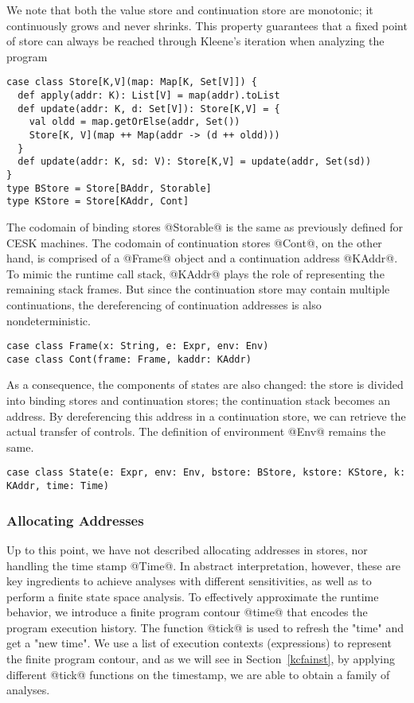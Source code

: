 \documentclass[acmsmall]{acmart}\settopmatter{}
\begin{document}
We note that both the value store and continuation store are monotonic;
it continuously grows and never shrinks. This property guarantees that
a fixed point of store can always be reached through Kleene's
iteration when analyzing the program

\begin{lstlisting}
case class Store[K,V](map: Map[K, Set[V]]) {
  def apply(addr: K): List[V] = map(addr).toList
  def update(addr: K, d: Set[V]): Store[K,V] = {
    val oldd = map.getOrElse(addr, Set())
    Store[K, V](map ++ Map(addr -> (d ++ oldd)))
  }
  def update(addr: K, sd: V): Store[K,V] = update(addr, Set(sd))
}
type BStore = Store[BAddr, Storable]
type KStore = Store[KAddr, Cont]
\end{lstlisting}

The codomain of binding stores @Storable@ is the same as previously defined for CESK 
machines. The codomain of continuation stores @Cont@, on the other hand, is comprised of
a @Frame@ object and a continuation address @KAddr@. To mimic the runtime call stack, 
@KAddr@ plays the role of representing the remaining stack frames.
But since the continuation store may contain multiple continuations, the dereferencing 
of continuation addresses is also nondeterministic.

\begin{lstlisting}
case class Frame(x: String, e: Expr, env: Env)
case class Cont(frame: Frame, kaddr: KAddr)
\end{lstlisting}

As a consequence, the components of states are also changed: the store is divided
into binding stores and continuation stores; the continuation stack becomes an address.
By dereferencing this address in a continuation store, we can retrieve the actual 
transfer of controls. The definition of environment @Env@ remains the same.

\begin{lstlisting}
case class State(e: Expr, env: Env, bstore: BStore, kstore: KStore, k: KAddr, time: Time)
\end{lstlisting}

\subsubsection{Allocating Addresses}
Up to this point, we have not described allocating addresses in stores,
nor handling the time stamp @Time@.
In abstract interpretation, however, these are key ingredients to achieve
analyses with different sensitivities, as well as to perform a finite
state space analysis\cite{Gilray:2016:ACP:2951913.2951936}.
To effectively approximate the runtime behavior, we introduce a finite
program contour @time@ that encodes the program execution history.
The function @tick@ is used to refresh the "time" and get a "new time".
We use a list of execution contexts (expressions) to represent the finite 
program contour, and as we will see in Section~\ref{kcfainst}, by applying 
different @tick@ functions on the timestamp, we are able to obtain a 
family of analyses.
\end{document}
